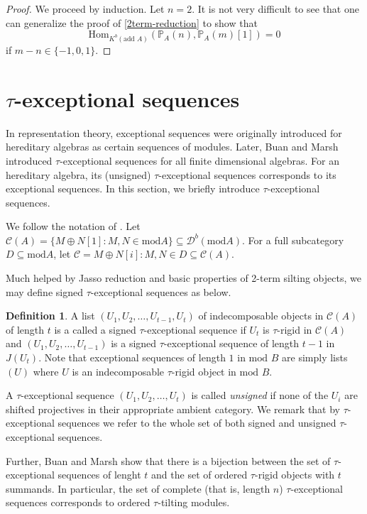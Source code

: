 \documentclass[]{article}
\theoremstyle{definition}
\newtheorem{definition}{Definition}[section]
\newcommand{\tu}{\ensuremath{\tau}}
\begin{document}
\begin{proof}
	We proceed by induction. Let $n = 2$. It is not very difficult to see that one can generalize the proof of \cref{2term-reduction} to show that \[\text{Hom}_{K^b(\text{add } A)}(\mathbb{P}_A(n),\mathbb{P}_A(m)[1]) = 0\] if $m-n \in \{-1,0,1\}$.

\end{proof}

\section{\tu-exceptional sequences}
In representation theory, exceptional sequences were originally introduced for hereditary algebras\cite{cbw92}\cite{ringel_exceptional} as certain sequences of modules. Later, Buan and Marsh introduced \tu-exceptional sequences\cite{buantau2020} for all finite dimensional algebras. For an hereditary algebra, its (unsigned) \tu-exceptional sequences corresponds to its exceptional sequences. In this section, we briefly introduce \tu-exceptional sequences. 

We follow the notation of \cite{buantau2020}. Let $\mathcal{C}(A) = \{M \oplus N[1] : M,N \in \text{mod} A\} \subseteq \mathcal{D}^b(\text{mod} A)$. For a full subcategory $D \subseteq \text{mod} A$, let $\mathcal{C} = {M \oplus N[i] : M,N \in D} \subseteq \mathcal{C}(A)$.

Much helped by Jasso reduction and basic properties of 2-term silting objects, we may define signed \tu-exceptional sequences as below.

\begin{definition}
A list $(U_1,U_2,\dots,U_{t-1},U_t)$ of indecomposable objects in $\mathcal{C}(A)$ of length $t$ is a called a signed \tu-exceptional sequence if $U_t$ is $\tu$-rigid in $\mathcal{C}(A)$ and $(U_1,U_2,\dots,U_{t-1})$ is a signed \tu-exceptional sequence of length $t-1$ in $J(U_t)$. Note that exceptional sequences of length $1$ in $\text{mod } B$ are simply lists $(U)$ where $U$ is an indecomposable \tu-rigid object in $\text{mod } B$.
\end{definition} 

A \tu-exceptional sequence $(U_1,U_2,\dots,U_t)$ is called \textit{unsigned} if none of the $U_i$ are shifted projectives in their appropriate ambient category. We remark that by \tu-exceptional sequences we refer to the whole set of both signed and unsigned \tu-exceptional sequences.

Further, Buan and Marsh show that there is a bijection between the set of \tu-exceptional sequences of lenght $t$ and the set of ordered \tu-rigid objects with $t$ summands. In particular, the set of complete (that is, length $n$) \tu-exceptional sequences corresponds to ordered \tu-tilting modules.
\end{document}
